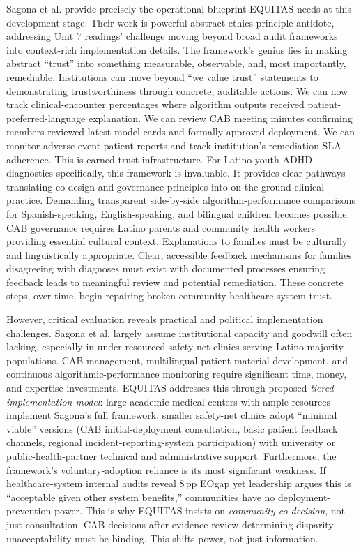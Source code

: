 \documentclass[11pt,twoside]{article}
\DeclareRobustCommand{\EOgap}{EO\text{-}gap\xspace}
\DeclareRobustCommand{\pp}{pp\xspace} %
\begin{document}
Sagona et al. provide precisely the operational blueprint EQUITAS needs at this development stage. Their work is powerful abstract ethics-principle antidote, addressing Unit 7 readings' challenge moving beyond broad audit frameworks into context-rich implementation details. The framework's genius lies in making abstract ``trust'' into something measurable, observable, and, most importantly, remediable. Institutions can move beyond ``we value trust'' statements to demonstrating trustworthiness through concrete, auditable actions. We can now track clinical-encounter percentages where algorithm outputs received patient-preferred-language explanation. We can review CAB meeting minutes confirming members reviewed latest model cards and formally approved deployment. We can monitor adverse-event patient reports and track institution's remediation-SLA adherence. This is earned-trust infrastructure. For Latino youth ADHD diagnostics specifically, this framework is invaluable. It provides clear pathways translating co-design and governance principles into on-the-ground clinical practice. Demanding transparent side-by-side algorithm-performance comparisons for Spanish-speaking, English-speaking, and bilingual children becomes possible. CAB governance requires Latino parents and community health workers providing essential cultural context. Explanations to families must be culturally and linguistically appropriate. Clear, accessible feedback mechanisms for families disagreeing with diagnoses must exist with documented processes ensuring feedback leads to meaningful review and potential remediation. These concrete steps, over time, begin repairing broken community-healthcare-system trust.

However, critical evaluation reveals practical and political implementation challenges. Sagona et al. largely assume institutional capacity and goodwill often lacking, especially in under-resourced safety-net clinics serving Latino-majority populations. CAB management, multilingual patient-material development, and continuous algorithmic-performance monitoring require significant time, money, and expertise investments. EQUITAS addresses this through proposed \textit{tiered implementation model}: large academic medical centers with ample resources implement Sagona's full framework; smaller safety-net clinics adopt ``minimal viable'' versions (CAB initial-deployment consultation, basic patient feedback channels, regional incident-reporting-system participation) with university or public-health-partner technical and administrative support. Furthermore, the framework's voluntary-adoption reliance is its most significant weakness. If healthcare-system internal audits reveal 8\,\pp \EOgap yet leadership argues this is ``acceptable given other system benefits,'' communities have no deployment-prevention power. This is why EQUITAS insists on \textit{community co-decision}, not just consultation. CAB decisions after evidence review determining disparity unacceptability must be binding. This shifts power, not just information.
\end{document}
